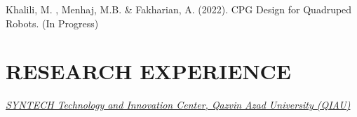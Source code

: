 \documentclass[10pt,a4paper,sans]{moderncv} %
\begin{document}









	Khalili, M. , Menhaj, M.B. \& Fakharian, A. (2022). CPG Design for Quadruped Robots. \hfill(In Progress)%
	
	\section{RESEARCH EXPERIENCE}
    
		\href{http://www.syntechcenter.ir/}{ \emph{SYNTECH Technology and Innovation Center, Qazvin Azad University (QIAU)}} 
		
\end{document}
